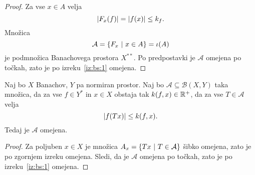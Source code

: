 \begin{proof}
Za vse $x \in A$ velja
\[
\left\lvert F_x(f)\right\rvert = \left\lvert f(x)\right\rvert \leq k_f.
\]
Množica
\[
\mathcal{A} = \left\{F_x~\middle\vert~x \in A\right\} = \iota(A)
\]
je podmnožica Banachovega prostora $X^{**}$. Po predpostavki je
$\mathcal{A}$ omejena po točkah, zato je po izreku~\ref{iz:bs:1}
omejena.
\end{proof}

\begin{posledica}
Naj bo $X$ Banachov, $Y$ pa normiran prostor. Naj bo
$\mathcal{A} \subseteq \mathcal{B}(X,Y)$ taka množica, da za vse
$f \in Y^*$ in $x \in X$ obstaja tak $k(f,x) \in \mathbb{R}^+$, da za vse
$T \in \mathcal{A}$ velja
\[
\left\lvert f(Tx)\right\rvert \leq k(f,x).
\]
Tedaj je $\mathcal{A}$ omejena.
\end{posledica}

\begin{proof}
Za poljuben $x \in X$ je množica $A_x=\left\{Tx~\middle\vert~T \in \mathcal{A}\right\}$
šibko omejena, zato je po zgornjem izreku omejena. Sledi, da je
$\mathcal{A}$ omejena po točkah, zato je po izreku~\ref{iz:bs:1}
omejena.
\end{proof}
